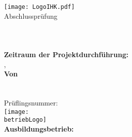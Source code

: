\begin{titlepage}

\begin{center}
\texttt{[image: LogoIHK.pdf]}\\[1ex]
\Large{Abschlussprüfung \pruefungstermin}\\[3ex]

\LARGE{\betreff}\\[4ex]

\huge{\textbf{\titel}}\\[1.5ex]
\Large{\textbf{\untertitel}}\\[4ex]

\normalsize
\textbf{Zeitraum der Projektdurchführung:}\\
{\abgabeOrt}, \projektZeitraum\\[2em]
\textbf{Von}\\
\autorName\\
\ausbildungsberuf\\
Prüflingsnummer: \prueflingsNummer\\[6ex]

\texttt{[image: \\betriebLogo]}\\[2ex]
\textbf{Ausbildungsbetrieb:}\\
\betriebName\\
\betriebAnschrift\\
\betriebOrt\\[5em]
\end{center}

\end{titlepage}